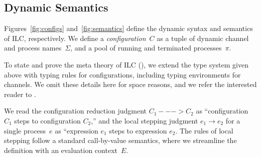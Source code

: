\begin{comment}
The fork rule says that that if we can appropriately split the affine context
such that the child process $e_1$ has type $A$ and mode $m_1$ and the
``continue'' process $e_2$ has type $B$ and mode $m_2$, then the whole
expression has type $B$ and mode $m_3$, which is derived by composing $m_1$ and
$m_2$ in parallel. Again, we emphasize that composing two write mode processes
in parallel violates type checking, i.e., $\Wm ;; \Wm => p$ cannot be derived
for any mode $p$.

Finally, the choice rule says that if we can appropriately split the affine
context such that both subexpressions $A$ and mode $R$, then the whole
expression follows exactly.

\paragraph{Affine rules.} The affine typing rules are, for the most part, analagous to their
intuitionistic counterparts. Two differences bear mentioning. First, the bang!
rule only lifts intuitionistically typed expressions that are closed with
respect to affine variables into an affinely typed expression. Otherwise, one
could wrap an intuitionistically typed expression with free affine variables in
a bang! and use it in an unrestricted manner. Second, in contrast with the abs
rule, the lollipop rule does not require function bodies to be free with respect
to affine variables.
\end{comment}

\subsection{Dynamic Semantics}
\label{subsec:semantics}

Figures~\ref{fig:configs} and~\ref{fig:semantics} define the dynamic syntax and
semantics of ILC, respectively.
%
We define a \emph{configuration}~$C$ as a tuple of dynamic channel and process names~$\Sigma$, 
and a pool of running and terminated processes~$\pi$.

To state and prove the meta theory of ILC (), we
extend the type system given above with typing rules for
configurations, including typing environments for channels. 
%
We omit these details here for space reasons, 
and we refer the interested reader to .

We read the configuration reduction judgment $C_1 ---> C_2$ as ``configuration
$C_1$ steps to configuration $C_2$,'' 
%
and the local stepping judgment $e_1 \longrightarrow e_2$ for a single process~$e$ as
``expression $e_1$ steps to expression $e_2$.
%
The rules of local stepping follow a standard call-by-value semantics, 
where we streamline the definition with an evaluation context~$E$.

